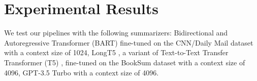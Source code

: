 \section{Experimental Results}

We test our pipelines with the following summarizers: Bidirectional and
Autoregressive Transformer (BART) \cite{lewis-etal-2020-bart} fine-tuned on the
CNN/Daily Mail dataset \cite{nallapati2016abstractive} with a context size of 1024,
LongT5 \cite{guo2021longt5}, a variant of Text-to-Text Transfer Transformer (T5)
\cite{raffel2020exploring}, fine-tuned on the BookSum dataset with a context size
of 4096, GPT-3.5 Turbo \cite{brown2020language} with a context size of 4096.
